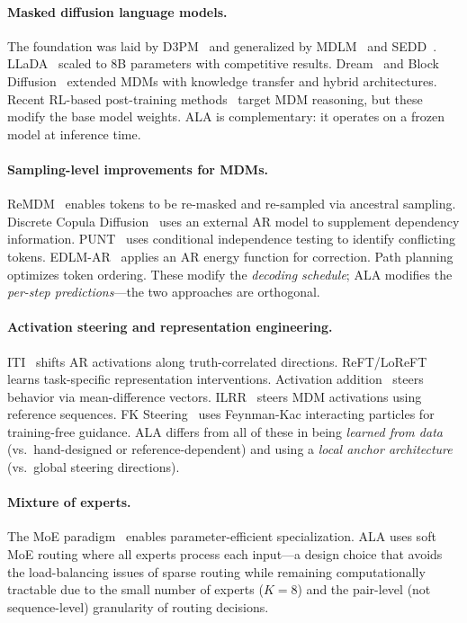 \documentclass{article} %
\begin{document}
\paragraph{Masked diffusion language models.}
The foundation was laid by D3PM~\citep{austin2021structured} and generalized by MDLM~\citep{sahoo2024simple} and SEDD~\citep{lou2024discrete}.
LLaDA~\citep{nie2025llada} scaled to 8B parameters with competitive results.
Dream~\citep{dream2025} and Block Diffusion~\citep{arriola2025block} extended MDMs with knowledge transfer and hybrid architectures.
Recent RL-based post-training methods~\citep{ou2025d1} target MDM reasoning, but these modify the base model weights.
ALA is complementary: it operates on a frozen model at inference time.

\paragraph{Sampling-level improvements for MDMs.}
ReMDM~\citep{shi2025remdm} enables tokens to be re-masked and re-sampled via ancestral sampling.
Discrete Copula Diffusion~\citep{nisonoff2025copula} uses an external AR model to supplement dependency information.
PUNT~\citep{chen2025punt} uses conditional independence testing to identify conflicting tokens.
EDLM-AR~\citep{sun2025edlm} applies an AR energy function for correction.
Path planning~\citep{gat2025p2} optimizes token ordering.
These modify the \emph{decoding schedule}; ALA modifies the \emph{per-step predictions}---the two approaches are orthogonal.

\paragraph{Activation steering and representation engineering.}
ITI~\citep{li2023iti} shifts AR activations along truth-correlated directions.
ReFT/LoReFT~\citep{wu2024reft} learns task-specific representation interventions.
Activation addition~\citep{turner2024steering} steers behavior via mean-difference vectors.
ILRR~\citep{wang2026ilrr} steers MDM activations using reference sequences.
FK Steering~\citep{niehues2025fk} uses Feynman-Kac interacting particles for training-free guidance.
ALA differs from all of these in being \emph{learned from data} (vs.\ hand-designed or reference-dependent) and using a \emph{local anchor architecture} (vs.\ global steering directions).

\paragraph{Mixture of experts.}
The MoE paradigm~\citep{shazeer2017moe} enables parameter-efficient specialization.
ALA uses soft MoE routing where all experts process each input---a design choice that avoids the load-balancing issues of sparse routing while remaining computationally tractable due to the small number of experts ($K{=}8$) and the pair-level (not sequence-level) granularity of routing decisions.
\end{document}
